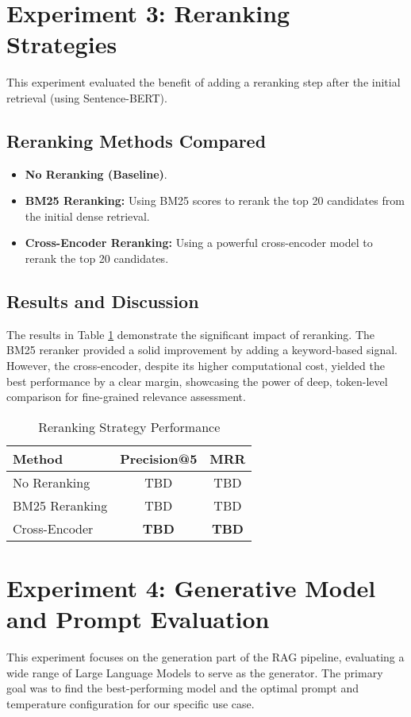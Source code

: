 \section{Experiment 3: Reranking Strategies}
\label{sec:exp_reranking}
This experiment evaluated the benefit of adding a reranking step after the initial retrieval (using Sentence-BERT).
\subsection{Reranking Methods Compared}
\begin{itemize}
    \item \textbf{No Reranking (Baseline)}.
    \item \textbf{BM25 Reranking:} Using BM25 scores to rerank the top 20 candidates from the initial dense retrieval.
    \item \textbf{Cross-Encoder Reranking:} Using a powerful cross-encoder model to rerank the top 20 candidates.
\end{itemize}
\subsection{Results and Discussion}
The results in Table \ref{tab:reranking_results} demonstrate the significant impact of reranking. The BM25 reranker provided a solid improvement by adding a keyword-based signal. However, the cross-encoder, despite its higher computational cost, yielded the best performance by a clear margin, showcasing the power of deep, token-level comparison for fine-grained relevance assessment.

\begin{table}[!htbp]
\centering
\caption{Reranking Strategy Performance}
\label{tab:reranking_results}
\begin{tabular}{|l|c|c|}
\hline
\textbf{Method} & \textbf{Precision@5} & \textbf{MRR} \\
\hline
No Reranking & TBD & TBD \\
BM25 Reranking & TBD & TBD \\
Cross-Encoder & \textbf{TBD} & \textbf{TBD} \\
\hline
\end{tabular}
\end{table}

\section{Experiment 4: Generative Model and Prompt Evaluation}
\label{sec:exp_generator_prompt}
This experiment focuses on the generation part of the RAG pipeline, evaluating a wide range of Large Language Models to serve as the generator. The primary goal was to find the best-performing model and the optimal prompt and temperature configuration for our specific use case.

